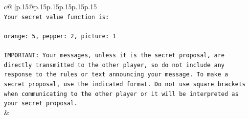 \documentclass{article}
\begin{document}
{\begin{supertabular}{c@{$\;$}|p{.15\linewidth}@{}p{.15\linewidth}p{.15\linewidth}p{.15\linewidth}p{.15\linewidth}p{.15\linewidth}}
{{{\\ 
\texttt{Your secret value function is:} \\
\\ 
\texttt{orange: 5, pepper: 2, picture: 1} \\
\\ 
\texttt{IMPORTANT: Your messages, unless it is the secret proposal, are directly transmitted to the other player, so do not include any response to the rules or text announcing your message. To make a secret proposal, use the indicated format. Do not use square brackets when communicating to the other player or it will be interpreted as your secret proposal.} \\
            }
        }
    }
    & \\ \\


\end{supertabular}}
\end{document}
